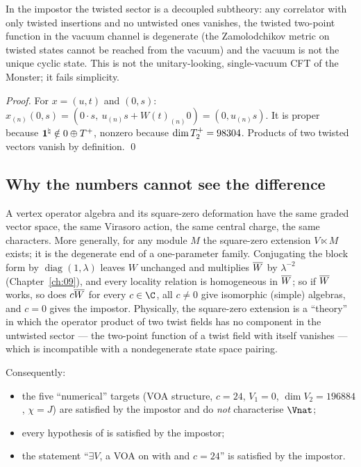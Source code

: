 \begin{physics}
In the impostor the twisted sector is a decoupled subtheory: any correlator with only twisted insertions and no untwisted ones vanishes, the twisted two-point function in the vacuum channel is degenerate (the Zamolodchikov metric on twisted states cannot be reached from the vacuum) and the vacuum is not the unique cyclic state. This is not the unitary-looking, single-vacuum CFT of the Monster; it fails simplicity.
\end{physics}

\emph{Proof.}  For $x=(u,t)$ and $(0,s)$: $x_{(n)}(0,s)=(0\cdot s,\ u_{(n)}s+W(t)_{(n)}0)=(0,u_{(n)}s)$.
It is proper because $\mathbf1^\natural\notin0\oplus T^{+}$, nonzero because
$\dim T^{+}_2=98304$.  Products of two twisted vectors vanish by definition. \qed

\subsection{Why the numbers cannot see the difference}

A vertex operator algebra and its square-zero deformation have the same graded vector space, the
same Virasoro action, the same central charge, the same characters.  More generally, for any
module $M$ the square-zero extension $V\ltimes M$ exists; it is the degenerate end of a one-parameter family.  Conjugating the block form by
$\operatorname{diag}(1,\lambda)$ leaves $W$ unchanged and multiplies $\overline{W}$ by $\lambda^{-2}$
(Chapter~\ref{ch:09}), and every locality relation is homogeneous in $\overline{W}$; so if
$\overline{W}$ works, so does $c\overline{W}$ for every $c\in\C$, all $c\ne0$ give isomorphic (simple)
algebras, and $c=0$ gives the impostor.  Physically, the square-zero extension is a ``theory''
in which the operator product of two twist fields has no component in the untwisted sector ---
the two-point function of a twist field with itself vanishes --- which is incompatible with a
nondegenerate state space pairing.

Consequently:
\begin{itemize}
\item the five ``numerical'' targets (VOA structure, $c=24$, $V_1=0$, $\dim V_2=196884$, $\chi=J$)
  are satisfied by the impostor and do \emph{not} characterise $\Vnat$;
\item every hypothesis of  is satisfied by the impostor;
\item the statement ``$\exists V$, a VOA on  with  and
  $c=24$'' is satisfied by the impostor.
\end{itemize}

